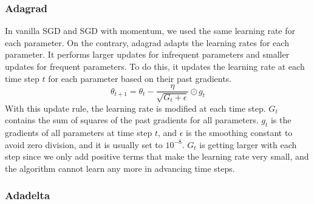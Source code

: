 \documentclass[a4paper, nobind]{templates/ociamthesis}
\begin{document}
\hypertarget{adagrad}{%
\subsubsection{Adagrad}\label{adagrad}}

\noindent In vanilla SGD and SGD with momentum, we used the same learning rate for each parameter. On the contrary, adagrad adapts the learning rates for each parameter. It performs larger updates for infrequent parameters and smaller updates for frequent parameters. To do this, it updates the learning rate at each time step \(t\) for each parameter based on their past gradients.
\[
\theta_{t+1}=\theta_{t}-\frac{\eta}{\sqrt{G_{t}+\epsilon}} \odot g_{t}
\]
With this update rule, the learning rate is modified at each time step. \(G_t\) contains the sum of squares of the past gradients for all parameters. \(g_t\) is the gradients of all parameters at time step \(t\), and \(\epsilon\) is the smoothing constant to avoid zero division, and it is usually set to \(10^{-8}\). \(G_t\) is getting larger with each step since we only add positive terms that make the learning rate very small, and the algorithm cannot learn any more in advancing time steps.

\hypertarget{adadelta}{%
\subsubsection{Adadelta}\label{adadelta}}
\end{document}
